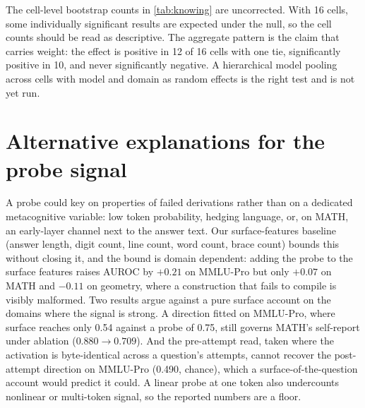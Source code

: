 The cell-level bootstrap counts in \cref{tab:knowing} are uncorrected. With 16 cells,
some individually significant results are expected under the null, so the cell counts
should be read as descriptive. The aggregate pattern is the claim that carries weight:
the effect is positive in 12 of 16 cells with one tie, significantly positive in 10,
and never significantly negative. A
hierarchical model pooling across cells with model and domain as random effects is the
right test and is not yet run.

\section{Alternative explanations for the probe signal}
\label{app:alternatives}
A probe could key on properties of failed derivations rather than on a dedicated
metacognitive variable: low token probability, hedging language, or, on MATH, an
early-layer channel next to the answer text. Our surface-features baseline (answer
length, digit count, line count, word count, brace count) bounds this without closing
it, and the bound is domain dependent: adding the probe to the surface features raises
AUROC by $+0.21$ on MMLU-Pro but only $+0.07$ on MATH and $-0.11$ on geometry, where a
construction that fails to compile is visibly malformed. Two results argue against a pure surface account on the
domains where the signal is strong. A direction fitted on MMLU-Pro, where surface
reaches only 0.54 against a probe of 0.75, still governs MATH's self-report under
ablation ($0.880 \to 0.709$). And the pre-attempt read, taken where the activation is
byte-identical across a question's attempts, cannot recover the post-attempt direction
on MMLU-Pro (0.490, chance), which a surface-of-the-question account would predict it
could. A linear probe at one token also undercounts nonlinear or multi-token signal, so
the reported numbers are a floor.

